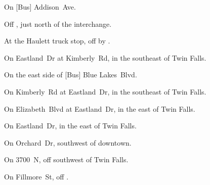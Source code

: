 
\begin{LocationList}

On  [Bus] Addison~Ave.

Off , just north of the  interchange.

At the Haulett truck stop, off  by  .

\Location{\GarageHQ \Garage}
On Eastland~Dr at Kimberly~Rd, in the southeast of Twin Falls.

On the east side of [Bus] Blue Lakes~Blvd.

On Kimberly~Rd at Eastland~Dr, in the southeast of Twin Falls.

On Elizabeth~Blvd at Eastland~Dr, in the east of Twin Falls.

\Location{\RecruitmentAgency \Recruitment}
On Eastland~Dr, in the east of Twin Falls.

On Orchard~Dr, southwest of downtown.

On 3700~N, off  southwest of Twin Falls.

On Fillmore~St, off .

\end{LocationList}
